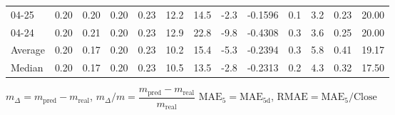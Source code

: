 \begin{threeparttable}
{\begin{tabular}{lrrrrrrrrrrrr}
  04-25 &          0.20 &          0.20 &          0.20 &        0.23 &                12.2 &                14.5 &       -2.3 &      -0.1596 &                 0.1 &              3.2 &            0.23 &                  20.00 \\
  04-24 &          0.20 &          0.21 &          0.20 &        0.23 &                12.9 &                22.8 &       -9.8 &      -0.4308 &                 0.3 &              3.6 &            0.25 &                  20.00 \\
Average &          0.20 &          0.17 &          0.20 &        0.23 &                10.2 &                15.4 &       -5.3 &      -0.2394 &                 0.3 &              5.8 &            0.41 &                  19.17 \\
 Median &          0.20 &          0.17 &          0.20 &        0.23 &                10.5 &                13.5 &       -2.8 &      -0.2313 &                 0.2 &              4.3 &            0.32 &                  17.50 \\
\bottomrule
\end{tabular}
}
\begin{tablenotes}\footnotesize
\item $m_\Delta=m_{\text{pred}}-m_{\text{real}}$,
$m_\Delta/m=\dfrac{m_{\text{pred}}-m_{\text{real}}}{m_{\text{real}}}$
$\mathrm{MAE}_5=\mathrm{MAE}_{5\text{d}}$,
$\mathrm{RMAE}=\mathrm{MAE}_5/\text{Close}$
\end{tablenotes}
\end{threeparttable}
\endgroup

